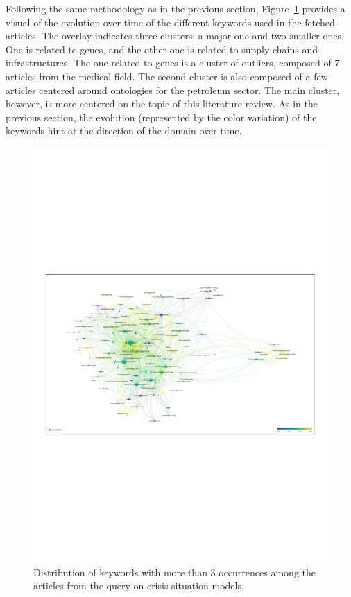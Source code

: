 Following the same methodology as in the previous section, Figure~\ref{literature:situation-models-overlay} provides a visual of the evolution over time of the different keywords used in the fetched articles.
The overlay indicates three clusters: a major one and two smaller ones.
One is related to genes, and the other one is related to supply chains and infrastructures.
The one related to genes is a cluster of outliers, composed of 7 articles from the medical field.
The second cluster is also composed of a few articles centered around ontologies for the petroleum sector.
The main cluster, however, is more centered on the topic of this literature review.
As in the previous section, the evolution (represented by the color variation) of the keywords hint at the direction of the domain over time.

\begin{landscape}
    \begin{figure}[htb]
        \includegraphics[width=\paperwidth,height=\paperheight,keepaspectratio]{figures/chap-2/situation-models-overlay.pdf}
        \caption{Distribution of keywords with more than 3 occurrences among the articles from the query on crisis-situation models.}
        \label{literature:situation-models-overlay}
    \end{figure}
\end{landscape}

